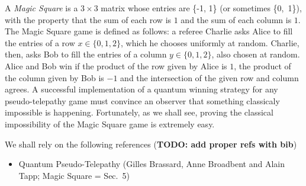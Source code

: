 \documentclass{llncs}
\newcommand{\todo}[1]{{\color{red}\bfseries{}TODO: #1}}
\begin{document}
A \emph{Magic Square} is a \(3 \times 3\) matrix whose entries are
\{-1, 1\} (or sometimes \{0,~1\}), with the property that the sum of
each row is \(1\) and the sum of each column is \(1\). The Magic
Square game is defined as follows: a referee Charlie asks Alice to
fill the entries of a row \(x \in \{0, 1, 2\}\), which he chooses
uniformly at random. Charlie, then, asks Bob to fill the entries of a
column \(y \in \{0, 1, 2\}\), also chosen at random. Alice and Bob win
if the product of the row given by Alice is \(1\), the product of the
column given by Bob is \(-1\) and the intersection of the given row
and column agrees. A successful implementation of a quantum winning
strategy for any pseudo-telepathy game must convince an observer that
something classicaly impossible is
happening\cite{brassard:2005}. Fortunately, as we shall see, proving
the classical impossibility of the Magic Square game is extremely easy.

We shall rely on the following references (\todo{add proper refs with
  bib})
\begin{itemize}
\item Quantum Pseudo-Telepathy (Gilles Brassard, Anne Broadbent and
  Alain Tapp; Magic Square = Sec.\ 5)
\end{itemize}
\end{document}
